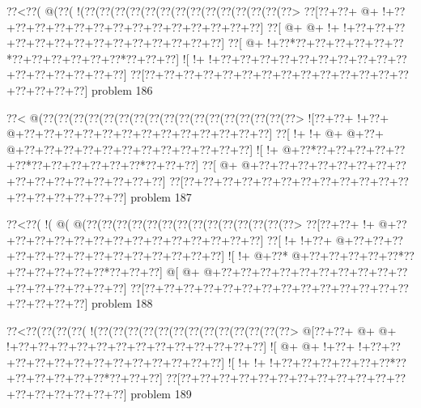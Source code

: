 \vbox{\vbox{\goo
\0??<\0??(\- @(\0??(\- !(\0??(\0??(\0??(\0??(\0??(\0??(\0??(\0??(\0??(\0??(\0??(\0??(\0??(\0??>
\0??[\0??+\0??+\- @+\- !+\0??+\0??+\0??+\0??+\0??+\0??+\0??+\0??+\0??+\0??+\0??+\0??+\0??+\0??]
\0??[\- @+\- @+\- !+\- !+\0??+\0??+\0??+\0??+\0??+\0??+\0??+\0??+\0??+\0??+\0??+\0??+\0??+\0??]
\0??[\- @+\- !+\0??*\0??+\0??+\0??+\0??+\0??+\0??*\0??+\0??+\0??+\0??+\0??+\0??*\0??+\0??+\0??]
\- ![\- !+\- !+\0??+\0??+\0??+\0??+\0??+\0??+\0??+\0??+\0??+\0??+\0??+\0??+\0??+\0??+\0??+\0??]
\0??[\0??+\0??+\0??+\0??+\0??+\0??+\0??+\0??+\0??+\0??+\0??+\0??+\0??+\0??+\0??+\0??+\0??+\0??]
}
\hfil problem 186\hfil\break
}



\vbox{\vbox{\goo
\0??<\- @(\0??(\0??(\0??(\0??(\0??(\0??(\0??(\0??(\0??(\0??(\0??(\0??(\0??(\0??(\0??(\0??(\0??>
\- ![\0??+\0??+\- !+\0??+\- @+\0??+\0??+\0??+\0??+\0??+\0??+\0??+\0??+\0??+\0??+\0??+\0??+\0??]
\0??[\- !+\- !+\- @+\- @+\0??+\- @+\0??+\0??+\0??+\0??+\0??+\0??+\0??+\0??+\0??+\0??+\0??+\0??]
\- ![\- !+\- @+\0??*\0??+\0??+\0??+\0??+\0??+\0??*\0??+\0??+\0??+\0??+\0??+\0??*\0??+\0??+\0??]
\0??[\- @+\- @+\0??+\0??+\0??+\0??+\0??+\0??+\0??+\0??+\0??+\0??+\0??+\0??+\0??+\0??+\0??+\0??]
\0??[\0??+\0??+\0??+\0??+\0??+\0??+\0??+\0??+\0??+\0??+\0??+\0??+\0??+\0??+\0??+\0??+\0??+\0??]
}
\hfil problem 187\hfil\break
}



\vbox{\vbox{\goo
\0??<\0??(\- !(\- @(\- @(\0??(\0??(\0??(\0??(\0??(\0??(\0??(\0??(\0??(\0??(\0??(\0??(\0??(\0??>
\0??[\0??+\0??+\- !+\- @+\0??+\0??+\0??+\0??+\0??+\0??+\0??+\0??+\0??+\0??+\0??+\0??+\0??+\0??]
\0??[\- !+\- !+\0??+\- @+\0??+\0??+\0??+\0??+\0??+\0??+\0??+\0??+\0??+\0??+\0??+\0??+\0??+\0??]
\- ![\- !+\- @+\0??*\- @+\0??+\0??+\0??+\0??+\0??*\0??+\0??+\0??+\0??+\0??+\0??*\0??+\0??+\0??]
\- @[\- @+\- @+\0??+\0??+\0??+\0??+\0??+\0??+\0??+\0??+\0??+\0??+\0??+\0??+\0??+\0??+\0??+\0??]
\0??[\0??+\0??+\0??+\0??+\0??+\0??+\0??+\0??+\0??+\0??+\0??+\0??+\0??+\0??+\0??+\0??+\0??+\0??]
}
\hfil problem 188\hfil\break
}



\vbox{\vbox{\goo
\0??<\0??(\0??(\0??(\0??(\- !(\0??(\0??(\0??(\0??(\0??(\0??(\0??(\0??(\0??(\0??(\0??(\0??(\0??>
\- @[\0??+\0??+\- @+\- @+\- !+\0??+\0??+\0??+\0??+\0??+\0??+\0??+\0??+\0??+\0??+\0??+\0??+\0??]
\- ![\- @+\- @+\- !+\0??+\- !+\0??+\0??+\0??+\0??+\0??+\0??+\0??+\0??+\0??+\0??+\0??+\0??+\0??]
\- ![\- !+\- !+\- !+\0??+\0??+\0??+\0??+\0??+\0??*\0??+\0??+\0??+\0??+\0??+\0??*\0??+\0??+\0??]
\0??[\0??+\0??+\0??+\0??+\0??+\0??+\0??+\0??+\0??+\0??+\0??+\0??+\0??+\0??+\0??+\0??+\0??+\0??]
}
\hfil problem 189\hfil\break
}



